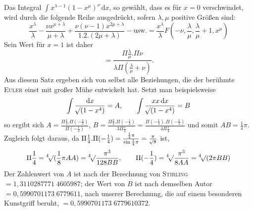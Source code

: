 Das Integral $\int x^{\lambda-1}(1-x^\mu)^\nu\,\mathrm{d}x$, so gewählt, dass es für $x=0$ verschwindet, wird durch die folgende Reihe ausgedrückt, sofern $\lambda,\mu$ positive Größen sind:
\[
\frac{x^\lambda}{\lambda}
-\frac{\nu x^{\mu+\lambda}}{\mu+\lambda}
+\frac{\nu(\nu-1)x^{2\mu+\lambda}}{1.2.(2\mu+\lambda)}
-\mathrm{usw.}
=\frac{x^\lambda}{\lambda}F(-\nu,\frac\lambda\mu,
\frac\lambda\mu+1,x^\mu)
\]
Sein Wert für $x=1$ ist daher
\[
=\frac{\Pi\frac\lambda\mu.\Pi\nu}
{\lambda\Pi(\frac\lambda\mu+\nu)}.
\]
Aus diesem Satz ergeben sich von selbst alle Beziehungen, die der berühmte \textsc{Euler} einst mit großer Mühe entwickelt hat. Setzt man beispielsweise
\[
\int\frac{\mathrm{d}x}{\BareRoot{(1-x^4)}}=A,\qquad
\int\frac{xx\,\mathrm{d}x}{\BareRoot{(1-x^4)}}=B
\]
so ergibt sich $A=\frac{\Pi\frac14.\Pi(-\frac12)}{\Pi(-\frac14)}$, $B=\frac{\Pi\frac34.\Pi(-\frac12)}{3\Pi\frac14}
=\frac{\Pi(-\frac14).\Pi(-\frac12)}{4\Pi\frac14}$ und somit $AB=\frac14\pi$. Zugleich folgt daraus, da $\Pi\frac14.\Pi(-\frac14)=\frac{\frac14\pi}{\sin\frac14\pi}
=\frac\pi{\BareRoot{8}}$ ist,
\[
\Pi\frac14=\BareRoot[4]{(\frac18\pi AA)}
=\BareRoot[4]{\frac{\pi^3}{128BB}},\qquad
\Pi(-\frac14)=\BareRoot[4]{\frac{\pi^3}{8AA}}
=\BareRoot[4]{(2\pi BB)}
\]
Der Zahlenwert von $A$ ist nach der Berechnung von \textsc{Stirling} $=1{,}3110287771\;\allowbreak 4605987$; der Wert von $B$ ist nach demselben Autor $=0{,}5990701173\;\allowbreak 6779611$, nach unserer Berechnung, die auf einem besonderen Kunstgriff beruht, $=0{,}5990701173\;\allowbreak 6779610372$.

